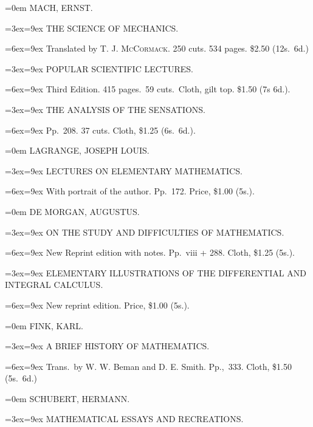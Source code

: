 \documentclass[oneside]{book}
\begin{document}
{\parindent=0em \normalsize
MACH, ERNST.
\nopagebreak

\parindent=3ex\hangindent=9ex \small
THE SCIENCE OF MECHANICS.
\nopagebreak

\parindent=6ex\hangindent=9ex\footnotesize
Translated by \textsc{T. J. McCormack}. 250 cuts. 534 pages. \$2.50 (12s.~6d.)
\smallskip

\parindent=3ex\hangindent=9ex \small
POPULAR SCIENTIFIC LECTURES.
\nopagebreak

\parindent=6ex\hangindent=9ex\footnotesize
Third Edition. 415 pages.~59 cuts.~Cloth, gilt top. \$1.50 (7s 6d.).
\smallskip

\parindent=3ex\hangindent=9ex \small
THE ANALYSIS OF THE SENSATIONS.
\nopagebreak

\parindent=6ex\hangindent=9ex\footnotesize
Pp.~208. 37 cuts. Cloth, \$1.25 (6s.~6d.).
\smallskip

\parindent=0em \normalsize
LAGRANGE, JOSEPH LOUIS.
\nopagebreak

\parindent=3ex\hangindent=9ex \small
LECTURES ON ELEMENTARY MATHEMATICS.
\nopagebreak

\parindent=6ex\hangindent=9ex\footnotesize
With portrait of the author. Pp.~172. Price, \$1.00 (5s.).
\smallskip

\parindent=0em \normalsize
DE MORGAN, AUGUSTUS.
\nopagebreak

\parindent=3ex\hangindent=9ex \small
ON THE STUDY AND DIFFICULTIES OF MATHEMATICS.
\nopagebreak

\parindent=6ex\hangindent=9ex\footnotesize
New Reprint edition with notes. Pp.~viii + 288. Cloth, \$1.25 (5s.).
\smallskip

\parindent=3ex\hangindent=9ex \small
ELEMENTARY ILLUSTRATIONS OF THE DIFFERENTIAL AND INTEGRAL CALCULUS.
\nopagebreak

\parindent=6ex\hangindent=9ex\footnotesize
New reprint edition. Price, \$1.00 (5s.).
\smallskip

\parindent=0em \normalsize
FINK, KARL.
\nopagebreak

\parindent=3ex\hangindent=9ex \small
A BRIEF HISTORY OF MATHEMATICS.
\nopagebreak

\parindent=6ex\hangindent=9ex\footnotesize
Trans.~by W. W. Beman and D. E. Smith. Pp.,~333. Cloth, \$1.50 (5s.~6d.)
\smallskip

\parindent=0em \normalsize
SCHUBERT, HERMANN.
\nopagebreak

\parindent=3ex\hangindent=9ex \small
MATHEMATICAL ESSAYS AND RECREATIONS.
\nopagebreak

}
\end{document}

